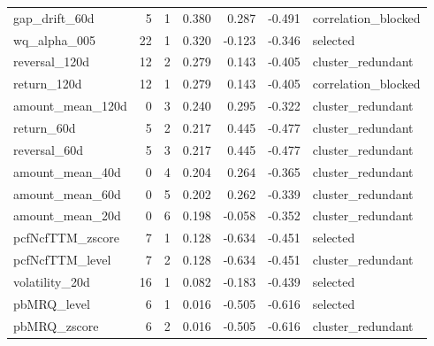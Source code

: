 \begin{longtable}{lrrrrrl}
gap\_drift\_60d & 5 & 1 & 0.380 & 0.287 & -0.491 & correlation\_blocked \\
wq\_alpha\_005 & 22 & 1 & 0.320 & -0.123 & -0.346 & selected \\
reversal\_120d & 12 & 2 & 0.279 & 0.143 & -0.405 & cluster\_redundant \\
return\_120d & 12 & 1 & 0.279 & 0.143 & -0.405 & correlation\_blocked \\
amount\_mean\_120d & 0 & 3 & 0.240 & 0.295 & -0.322 & cluster\_redundant \\
return\_60d & 5 & 2 & 0.217 & 0.445 & -0.477 & cluster\_redundant \\
reversal\_60d & 5 & 3 & 0.217 & 0.445 & -0.477 & cluster\_redundant \\
amount\_mean\_40d & 0 & 4 & 0.204 & 0.264 & -0.365 & cluster\_redundant \\
amount\_mean\_60d & 0 & 5 & 0.202 & 0.262 & -0.339 & cluster\_redundant \\
amount\_mean\_20d & 0 & 6 & 0.198 & -0.058 & -0.352 & cluster\_redundant \\
pcfNcfTTM\_zscore & 7 & 1 & 0.128 & -0.634 & -0.451 & selected \\
pcfNcfTTM\_level & 7 & 2 & 0.128 & -0.634 & -0.451 & cluster\_redundant \\
volatility\_20d & 16 & 1 & 0.082 & -0.183 & -0.439 & selected \\
pbMRQ\_level & 6 & 1 & 0.016 & -0.505 & -0.616 & selected \\
pbMRQ\_zscore & 6 & 2 & 0.016 & -0.505 & -0.616 & cluster\_redundant \\
\bottomrule
\end{longtable}
\normalsize
